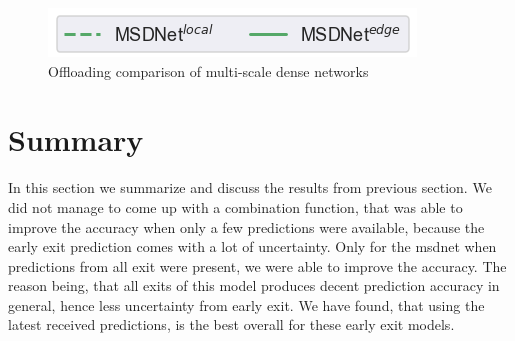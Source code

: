 \begin{figure}
	\captionsetup[subfigure]{justification=centering, farskip=0pt,captionskip=0pt}
	\centering
	\includegraphics[width=.3\linewidth]{figures/edge/gpu_msdnet_offloading_vs_local_legend}
	\hfill
	\hfill
	\caption[Offloading comparison of multi-scale dense networks]{Offloading comparison of multi-scale dense networks}
	\label{fig:msdnet-offloading-vs-local}
\end{figure}

\section{Summary} \label{sec:edge-summary}

In this section we summarize and discuss the results from previous section. We did not manage to come up with a combination function, that was able to improve the accuracy when only a few predictions were available, because the early exit prediction comes with a lot of uncertainty. Only for the \gls{msdnet} when predictions from all exit were present, we were able to improve the accuracy. The reason being, that all exits of this model produces decent prediction accuracy in general, hence less uncertainty from early exit. We have found, that using the latest received predictions, is the best overall for these early exit models.

